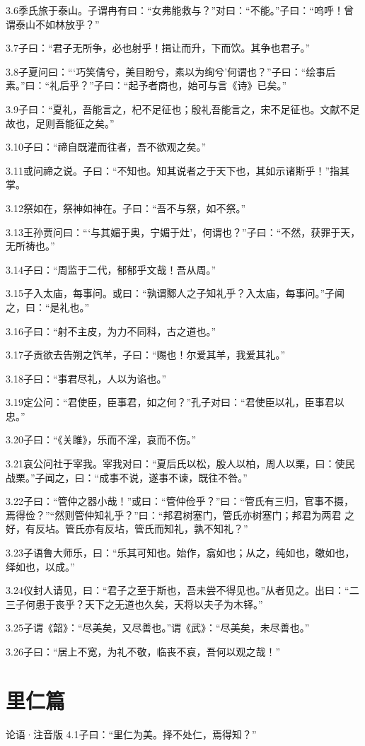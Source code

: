 \documentclass[a4paper,12pt,UTF8,twoside]{ctexbook}
\begin{document}
3.6季氏旅于泰山。子谓冉有曰：“女弗能救与？”对曰：“不能。”子曰：“呜呼！曾谓泰山不如林放乎？”

3.7子曰：“君子无所争，必也射乎！揖让而升，下而饮。其争也君子。”

3.8子夏问曰：“‘巧笑倩兮，美目盼兮，素以为绚兮’何谓也？”子曰：“绘事后素。”曰：“礼后乎？”子曰：“起予者商也，始可与言《诗》已矣。”

3.9子曰：“夏礼，吾能言之，杞不足征也；殷礼吾能言之，宋不足征也。文献不足故也，足则吾能征之矣。”

3.10子曰：“禘自既灌而往者，吾不欲观之矣。”

3.11或问禘之说。子曰：“不知也。知其说者之于天下也，其如示诸斯乎！”指其掌。

3.12祭如在，祭神如神在。子曰：“吾不与祭，如不祭。”

3.13王孙贾问曰：“‘与其媚于奥，宁媚于灶’，何谓也？”子曰：“不然，获罪于天，无所祷也。”

3.14子曰：“周监于二代，郁郁乎文哉！吾从周。”

3.15子入太庙，每事问。或曰：“孰谓鄹人之子知礼乎？入太庙，每事问。”子闻之，曰：“是礼也。”

3.16子曰：“射不主皮，为力不同科，古之道也。”

3.17子贡欲去告朔之饩羊，子曰：“赐也！尔爱其羊，我爱其礼。”

3.18子曰：“事君尽礼，人以为谄也。”

3.19定公问：“君使臣，臣事君，如之何？”孔子对曰：“君使臣以礼，臣事君以忠。”

3.20子曰：“《关雎》，乐而不淫，哀而不伤。”

3.21哀公问社于宰我。宰我对曰：“夏后氏以松，殷人以柏，周人以栗，曰：使民战栗。”子闻之，曰：“成事不说，遂事不谏，既往不咎。”

3.22子曰：“管仲之器小哉！”或曰：“管仲俭乎？”曰：“管氏有三归，官事不摄，焉得俭？”“然则管仲知礼乎？”曰：“邦君树塞门，管氏亦树塞门；邦君为两君
之好，有反坫。管氏亦有反坫，管氏而知礼，孰不知礼？”

3.23子语鲁大师乐，曰：“乐其可知也。始作，翕如也；从之，纯如也，皦如也，绎如也，以成。”

3.24仪封人请见，曰：“君子之至于斯也，吾未尝不得见也。”从者见之。出曰：“二三子何患于丧乎？天下之无道也久矣，天将以夫子为木铎。”

3.25子谓《韶》：“尽美矣，又尽善也。”谓《武》：“尽美矣，未尽善也。”

3.26子曰：“居上不宽，为礼不敬，临丧不哀，吾何以观之哉！”

\chapter{里仁篇}
论语·注音版
4.1子曰：“里仁为美。择不处仁，焉得知？”
\end{document}
